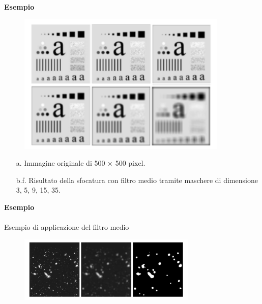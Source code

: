 \textbf{Esempio}

\begin{figure}[H]
    \centering
    \includegraphics[width=10cm, keepaspectratio]{capitoli/immagini/imgs/filtri-l-esempio.png}
\end{figure}

\begin{enumerate}
    \item [a.] Immagine originale di 500 × 500 pixel.
    \item [b.f.] Risultato della sfocatura con filtro medio tramite maschere di
          dimensione 3, 5, 9, 15, 35.
\end{enumerate}
\textbf{Esempio}
\\\\
Esempio di applicazione del filtro medio
\begin{figure}[H]
    \centering
    \includegraphics[width=\linewidth, keepaspectratio]{capitoli/immagini/imgs/filtro-l-esempio2.png}
\end{figure}

